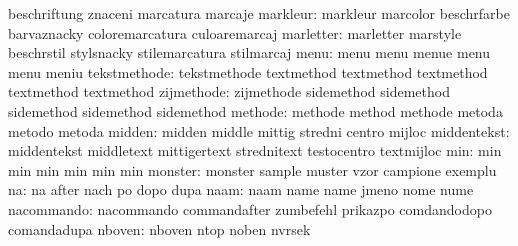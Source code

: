                            beschriftung              znaceni
                           marcatura                 marcaje
                 markleur: markleur                  marcolor
                           beschrfarbe               barvaznacky
                           coloremarcatura           culoaremarcaj
                marletter: marletter                 marstyle
                           beschrstil                stylsnacky
                           stilemarcatura            stilmarcaj
                     menu: menu                      menu
                           menue                     menu
                           menu                      meniu
             tekstmethode: tekstmethode              textmethod
                           textmethod                textmethod
                           textmethod                textmethod
               zijmethode: zijmethode                sidemethod
                           sidemethod                sidemethod
                           sidemethod                sidemethod
                  methode: methode                   method
                           methode                   metoda
                           metodo                    metoda
                   midden: midden                    middle
                           mittig                    stredni
                           centro                    mijloc %
              middentekst: middentekst               middletext
                           mittigertext              strednitext
                           testocentro               textmijloc %
                      min: min                       min
                           min                       min
                           min                       min
                  monster: monster                   sample
                           muster                    vzor
                           campione                  exemplu
                       na: na                        after
                           nach                      po
                           dopo                      dupa
                     naam: naam                      name
                           name                      jmeno
                           nome                      nume
               nacommando: nacommando                commandafter
                           zumbefehl                 prikazpo
                           comdandodopo              comandadupa
                   nboven: nboven                    ntop
                           noben                     nvrsek
